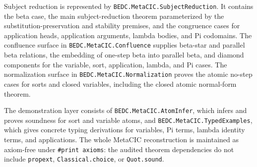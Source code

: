 Subject reduction is represented by
\texttt{BEDC.MetaCIC.SubjectReduction}. It contains the beta case, the main
subject-reduction theorem parameterized by the substitution-preservation and
stability premises, and the congruence cases for application heads,
application arguments, lambda bodies, and Pi codomains. The confluence
surface in \texttt{BEDC.MetaCIC.Confluence} supplies beta-star and parallel
beta relations, the embedding of one-step beta into parallel beta, and
diamond components for the variable, sort, application, lambda, and Pi
cases. The normalization surface in
\texttt{BEDC.MetaCIC.Normalization} proves the atomic no-step cases for
sorts and closed variables, including the closed atomic normal-form theorem.

The demonstration layer consists of \texttt{BEDC.MetaCIC.AtomInfer}, which
infers and proves soundness for sort and variable atoms, and
\texttt{BEDC.MetaCIC.TypedExamples}, which gives concrete typing derivations
for variables, Pi terms, lambda identity terms, and applications. The whole
MetaCIC reconstruction is maintained as axiom-free under
\texttt{\#print axioms}: the audited theorem dependencies do not include
\texttt{propext}, \texttt{Classical.choice}, or \texttt{Quot.sound}.
